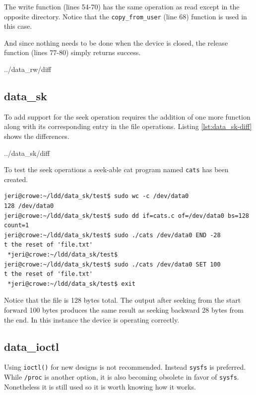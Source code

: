 \documentclass{article}
\begin{document}
The write function (lines 54-70) has the same operation as read
except in the opposite directory.
Notice that the \verb+copy_from_user+ (line 68) function is used
in this case.

And since nothing needs to be done when the device is closed,
the release function (lines 77-80) simply returns success.

\pagebreak

	{../data_rw/diff}


\clearpage
\subsection{data\_sk}

To add support for the seek operation requires the addition of
one more function along with its corresponding entry in the
file operations.  Listing \ref{lst:data_sk-diff} shows the
differences.


	{../data_sk/diff}

To test the seek operations a seek-able cat program named \verb+cats+
has been created.

\begin{verbatim}
jeri@crowe:~/ldd/data_sk/test$ sudo wc -c /dev/data0
128 /dev/data0
jeri@crowe:~/ldd/data_sk/test$ sudo dd if=cats.c of=/dev/data0 bs=128 count=1
jeri@crowe:~/ldd/data_sk/test$ sudo ./cats /dev/data0 END -28
t the reset of 'file.txt'
 *jeri@crowe:~/ldd/data_sk/test$ 
jeri@crowe:~/ldd/data_sk/test$ sudo ./cats /dev/data0 SET 100
t the reset of 'file.txt'
 *jeri@crowe:~/ldd/data_sk/test$ exit
\end{verbatim}

Notice that the file is 128 bytes total.
The output after seeking from the start forward 100 bytes produces
the same result as seeking backward 28 bytes from the end.
In this instance the device is operating correctly.


\subsection{data\_ioctl}

Using \verb+ioctl()+ for new designs is not recommended\autocite[Pg. 156]{corbet2009linux}\autocite{love2010linux}.
Instead \verb+sysfs+ is preferred.
While \verb+/proc+ is another option, it is also becoming obsolete in
favor of \verb+sysfs+.
Nonetheless it is still used so it is worth knowing how it works.
\end{document}
